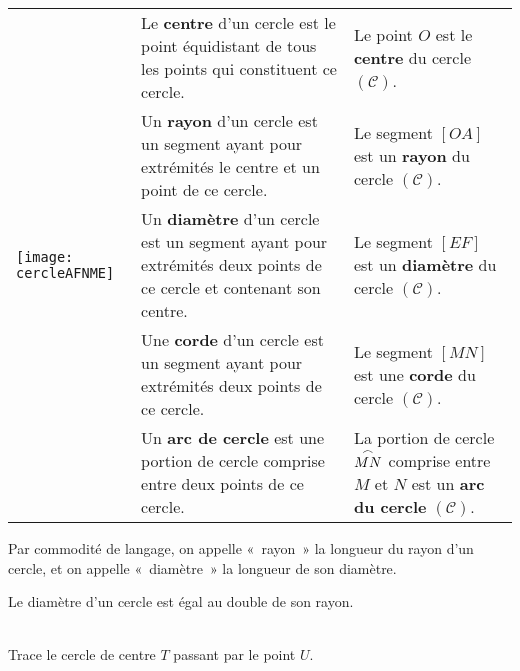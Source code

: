 \begin{methode*1}

 

\begin{tabularx}{.95\linewidth}{|X|p{5cm}|p{3cm}|}
\hline
\multirow{5}{*}{\texttt{[image: cercleAFNME]}}  & Le \textcolor{C2}{\textbf{centre}} d'un cercle est le point équidistant de tous les points qui constituent ce cercle. & Le point $O$ est le \textcolor{C2}{\textbf{centre}} du cercle $(\mathcal{C})$.\\ \cline{2-3}
 & Un \textcolor{J1}{\textbf{rayon}} d'un cercle est un segment ayant pour extrémités le centre et un point de ce cercle. & Le segment $[OA]$ est un  \textcolor{J1}{\textbf{rayon}} du cercle $(\mathcal{C})$.\\ \cline{2-3}
  & Un  \textcolor{H1}{\textbf{diamètre}} d'un cercle est un segment ayant pour extrémités deux points de ce cercle et contenant son centre. & Le segment $[EF]$ est un  \textcolor{H1}{\textbf{diamètre}} du cercle $(\mathcal{C})$.\\ \cline{2-3}
 & Une  \textcolor{PartieFonction}{\textbf{corde}} d'un cercle est un segment ayant pour extrémités deux points de ce cercle. & Le segment $[MN]$ est une  \textcolor{PartieFonction}{\textbf{corde}} du cercle $(\mathcal{C})$.\\ \cline{2-3}
 & Un  \textcolor{B2}{\textbf{arc de cercle}} est une portion de cercle comprise entre deux points de ce cercle. & La portion de cercle $\overset{\huge{\frown}}{MN}$ comprise entre $M$ et $N$ est un  \textcolor{B2}{\textbf{arc du cercle}} $(\mathcal{C})$.\\ \hline
  \end{tabularx}
  
 \begin{remarque}
 Par commodité de langage, on appelle « rayon » la longueur du rayon d'un cercle, et  on appelle « diamètre » la longueur de son diamètre.
  \end{remarque}
  
 \begin{remarque}
 Le diamètre d'un cercle est égal au double de son rayon.
  \end{remarque}

 \begin{exemple*1} \\[0.75em]
Trace le cercle de centre $T$ passant par le point $U$. \\[0.5em]


\end{exemple*1}
\end{methode*1}
